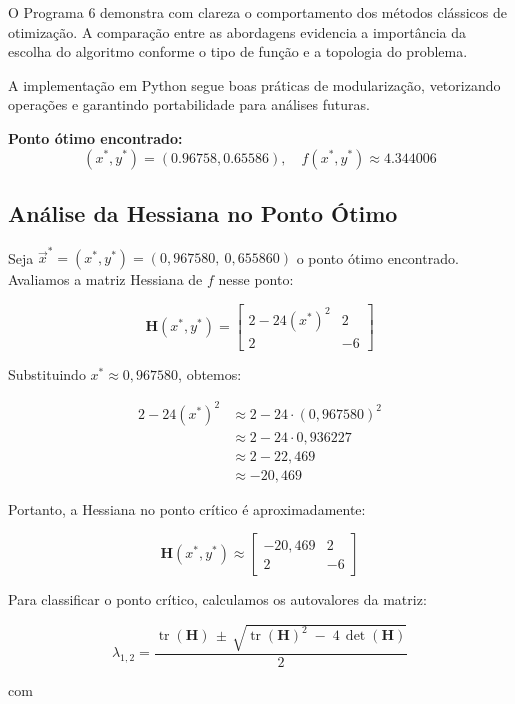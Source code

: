 \documentclass[12pt]{article}
\begin{document}
O Programa 6 demonstra com clareza o comportamento dos métodos clássicos de otimização. A comparação entre as abordagens evidencia a importância da escolha do algoritmo conforme o tipo de função e a topologia do problema.

A implementação em Python segue boas práticas de modularização, vetorizando operações e garantindo portabilidade para análises futuras.

\vspace{1em}
\noindent\textbf{Ponto ótimo encontrado:}
\begin{equation*}
    (x^*, y^*) = (0.96758, 0.65586), \quad f(x^*, y^*) \approx 4.344006
\end{equation*}

\subsection*{Análise da Hessiana no Ponto Ótimo}

Seja $\vec{x}^* = (x^*, y^*) = (0{,}967580,\ 0{,}655860)$ o ponto ótimo encontrado. Avaliamos a matriz Hessiana de $f$ nesse ponto:

\[
\mathbf{H}(x^*, y^*) = 
\begin{bmatrix}
2 - 24(x^*)^2 & 2 \\
2 & -6
\end{bmatrix}
\]

Substituindo $x^* \approx 0{,}967580$, obtemos:

\[
\begin{aligned}
2 - 24(x^*)^2 &\approx 2 - 24 \cdot (0{,}967580)^2 \\
&\approx 2 - 24 \cdot 0{,}936227 \\
&\approx 2 - 22{,}469 \\
&\approx -20{,}469
\end{aligned}
\]

Portanto, a Hessiana no ponto crítico é aproximadamente:

\[
\mathbf{H}(x^*, y^*) \approx
\begin{bmatrix}
-20{,}469 & 2 \\
2 & -6
\end{bmatrix}
\]

Para classificar o ponto crítico, calculamos os autovalores da matriz:

\[
\lambda_{1,2} = 
\frac{
\operatorname{tr}(\mathbf{H}) \,\pm\, 
\sqrt{\operatorname{tr}(\mathbf{H})^{2}\;-\;4\,\operatorname{det}(\mathbf{H})}
}{2}
\]

com
\end{document}
